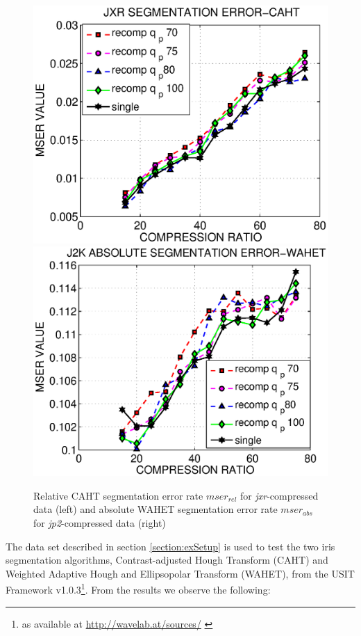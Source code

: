 \documentclass[10pt,twocolumn,letterpaper]{article}
\begin{document}
\begin{figure}
	\includegraphics[width=0.49\linewidth]{img/new/jxr_caht.eps}
	\includegraphics[width=0.49\linewidth]{img/new/j2k_abs_wahet.eps}	
	\caption{Relative CAHT segmentation error rate $mser_{rel}$ for \emph{jxr}-compressed data (left) and absolute WAHET segmentation error rate $mser_{abs}$ for \emph{jp2}-compressed data (right)}
	\label{fig:segResultsOther}
\end{figure}


The data set described in section \ref{section:exSetup} is used to test the two iris segmentation algorithms, Contrast-adjusted Hough Transform (CAHT) and Weighted Adaptive Hough and Ellipsopolar Transform (WAHET), from the USIT Framework v1.0.3\footnote{as available at \url{http://wavelab.at/sources/} \cite{Rathgeb12e}}. From the results we observe the following:
\end{document}
